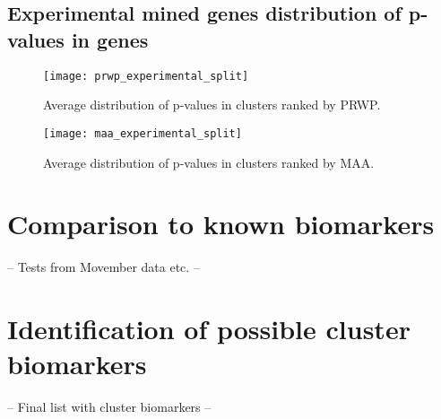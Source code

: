 \subsection{Experimental mined genes distribution of p-values in genes}
\begin{figure}[H]
    \label{fig:exp-iref-prwp}
    \texttt{[image: prwp\_experimental\_split]}
    \caption{Average distribution of p-values in clusters ranked by PRWP.}
\end{figure}
\begin{figure}[H]
    \label{fig:exp-iref-maa}
    \texttt{[image: maa\_experimental\_split]}
    \caption{Average distribution of p-values in clusters ranked by MAA.}
\end{figure}

\section{Comparison to known biomarkers}
-- Tests from Movember data etc. --

\section{Identification of possible cluster biomarkers}
-- Final list with cluster biomarkers --
